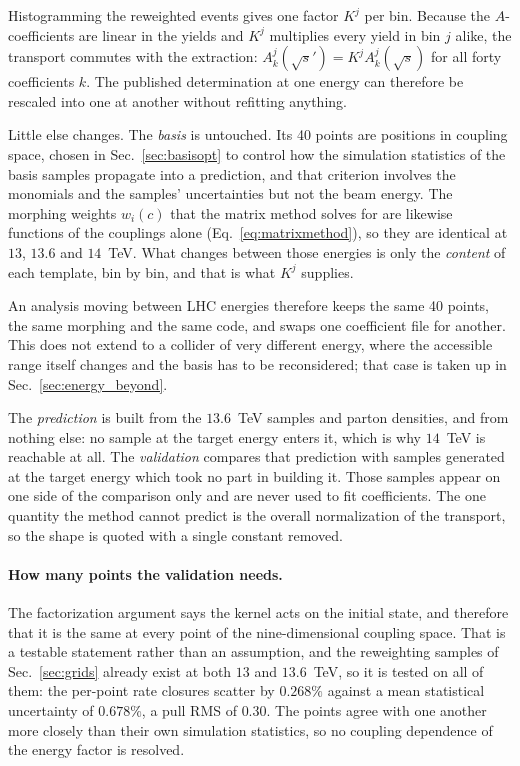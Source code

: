 Histogramming the reweighted events gives one factor $K^j$ per bin. Because the
$A$-coefficients are linear in the yields and $K^j$ multiplies every yield in bin $j$
alike, the transport commutes with the extraction:
$A^j_k(\sqrt{s}') = K^j A^j_k(\sqrt{s})$ for all forty coefficients $k$. The published
determination at one energy can therefore be rescaled into one at another without
refitting anything.

Little else changes. The \emph{basis} is untouched. Its 40 points are positions in coupling
space, chosen in Sec.~\ref{sec:basisopt} to control how the simulation statistics of the
basis samples propagate into a prediction, and that criterion involves the monomials and
the samples' uncertainties but not the beam energy. The morphing weights $w_i(c)$ that
the matrix method solves for are likewise functions of the couplings alone
(Eq.~\eqref{eq:matrixmethod}), so they are identical at $13$, $13.6$ and $14$~TeV. What
changes between those energies is only the \emph{content} of each template, bin by bin,
and that is what $K^j$ supplies.

An analysis moving between LHC energies therefore keeps the same 40 points, the same
morphing and the same code, and swaps one coefficient file for another. This does not
extend to a collider of very different energy, where the accessible \mHH range itself
changes and the basis has to be reconsidered; that case is taken up in
Sec.~\ref{sec:energy_beyond}.

The \emph{prediction} is built from the $13.6$~TeV samples and parton densities, and from
nothing else: no sample at the target energy enters it, which is why $14$~TeV is reachable
at all. The \emph{validation} compares that prediction with samples generated at the target
energy which took no part in building it. Those samples appear on one side of the
comparison only and are never used to fit coefficients. The one quantity the method cannot
predict is the overall normalization of the transport, so the shape is quoted with a single
constant removed.

\paragraph{How many points the validation needs.}
The factorization argument says the kernel acts on the initial state, and therefore that
it is the same at every point of the nine-dimensional coupling space. That is a testable
statement rather than an assumption, and the reweighting samples of
Sec.~\ref{sec:grids} already exist at both $13$ and $13.6$~TeV, so it is tested on all of
them: the per-point rate closures scatter by $0.268\%$ against a mean statistical
uncertainty of $0.678\%$, a pull RMS of $0.30$. The points agree with one another more
closely than their own simulation statistics, so no coupling dependence of the energy
factor is resolved.

